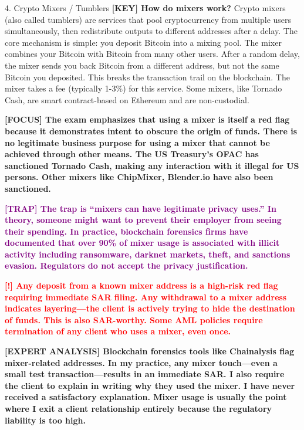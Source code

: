 \documentclass[11pt,a4paper]{beamer}
\newcommand{\redflag}[1]{\textcolor{red}{\textbf{[!] #1}}}
\newcommand{\examfocus}[1]{\textcolor{orange!80!black}{\textbf{[FOCUS] #1}}}
\newcommand{\trap}[1]{\textcolor{purple}{\textbf{[TRAP] #1}}}
\newcommand{\keyterm}[1]{\textcolor{red!80!black}{\textbf{[KEY] #1}}}
\newcommand{\expert}[1]{\textcolor{blue!70!black}{\textbf{[EXPERT ANALYSIS] #1}}}
\begin{document}
	\begin{frame}{4. Crypto Mixers / Tumblers}
		\tiny
		\keyterm{How do mixers work?} Crypto mixers (also called tumblers) are services that pool cryptocurrency from multiple users simultaneously, then redistribute outputs to different addresses after a delay. The core mechanism is simple: you deposit Bitcoin into a mixing pool. The mixer combines your Bitcoin with Bitcoin from many other users. After a random delay, the mixer sends you back Bitcoin from a different address, but not the same Bitcoin you deposited. This breaks the transaction trail on the blockchain. The mixer takes a fee (typically 1-3\%) for this service. Some mixers, like Tornado Cash, are smart contract-based on Ethereum and are non-custodial.
		
		\vspace{0.1cm}
		\examfocus{The exam emphasizes that using a mixer is itself a red flag because it demonstrates intent to obscure the origin of funds. There is no legitimate business purpose for using a mixer that cannot be achieved through other means. The US Treasury's OFAC has sanctioned Tornado Cash, making any interaction with it illegal for US persons. Other mixers like ChipMixer, Blender.io have also been sanctioned.}
		
		\vspace{0.1cm}
		\trap{The trap is “mixers can have legitimate privacy uses.” In theory, someone might want to prevent their employer from seeing their spending. In practice, blockchain forensics firms have documented that over 90\% of mixer usage is associated with illicit activity including ransomware, darknet markets, theft, and sanctions evasion. Regulators do not accept the privacy justification.}
		
		\vspace{0.1cm}
		\redflag{Any deposit from a known mixer address is a high-risk red flag requiring immediate SAR filing. Any withdrawal to a mixer address indicates layering—the client is actively trying to hide the destination of funds. This is also SAR-worthy. Some AML policies require termination of any client who uses a mixer, even once.}
		
		\vspace{0.1cm}
		\expert{Blockchain forensics tools like Chainalysis flag mixer-related addresses. In my practice, any mixer touch—even a small test transaction—results in an immediate SAR. I also require the client to explain in writing why they used the mixer. I have never received a satisfactory explanation. Mixer usage is usually the point where I exit a client relationship entirely because the regulatory liability is too high.}
	\end{frame}
	
\end{document}
